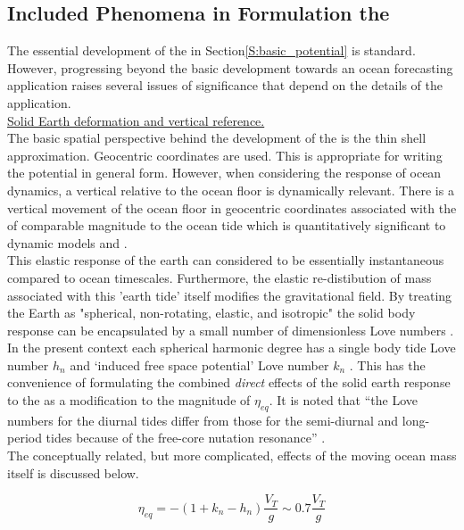 \subsection{Included Phenomena in Formulation the \ATGP{}}
\label{S:ATGP_extras}
The essential development of the \ATGP{} in Section\ref{S:basic_potential} is standard.  However, progressing beyond the basic development towards an ocean forecasting application raises several issues of significance that depend on the details of the application.\\


\underline{Solid Earth deformation and vertical reference.}  \\
The basic spatial perspective behind the development of the \ATGP{} is the thin shell approximation.  Geocentric coordinates are used.  This is appropriate for writing the potential in general form.  However, when considering the response of ocean dynamics, a vertical relative to the ocean floor is dynamically relevant.  There is a vertical movement of the ocean floor in geocentric coordinates associated with the \ATGP{} of comparable magnitude to the ocean tide which is quantitatively significant to dynamic models \citep{Hendershott:1981ub} and \citep[pp.336]{gill1982atmosphere}.\\
This elastic response of the earth can considered to be essentially instantaneous compared to ocean timescales.  Furthermore, the elastic re-distibution of mass associated with this 'earth tide' itself modifies the gravitational field.    By treating the Earth as "spherical, non-rotating, elastic, and isotropic" the solid body response can be encapsulated by a small number of dimensionless Love numbers \citep{Agnew:2011ub}.  In the present context each spherical harmonic degree has a single body tide Love number $h_n$ and `induced free space potential' Love number $k_n$ \citep[Sec 5.3.3]{Urban:2013vl}. This has the convenience of formulating the combined \emph{direct} effects of the solid earth response to the \ATGP{} as a modification to the magnitude of $\eta_{eq}$.  It is noted that ``the Love numbers for the diurnal tides differ from those for the semi-diurnal and long-period tides because of the free-core nutation resonance'' \citep{Arbic:2004wz}.\\
The conceptually related, but more complicated, effects of the moving ocean mass itself is discussed below.

\begin{equation}
\eta_{eq} = -(1+k_n-h_n) \frac{V_T}{g} \sim 0.7 \frac{V_T}{g}
\end{equation} 



